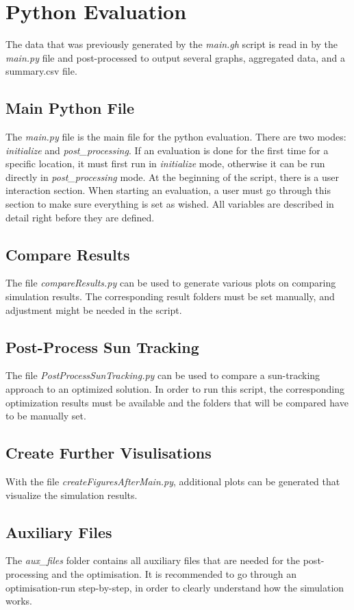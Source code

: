 \section{Python Evaluation}

	The data that was previously generated by the \emph{main.gh} script is read in by the \emph{main.py} file and post-processed to output several graphs, aggregated data, and a summary.csv file. 

	\subsection{Main Python File}
	The \emph{main.py} file is the main file for the python evaluation. There are two modes: \emph{initialize} and \emph{post\_processing}. If an evaluation is done for the first time for a specific location, it must first run in \emph{initialize} mode, otherwise it can be run directly in \emph{post\_processing} mode. 
	At the beginning of the script, there is a user interaction section. When starting an evaluation, a user must go through this section to make sure everything is set as wished. All variables are described in detail right before they are defined. 

	\subsection{Compare Results}
	The file \emph{compareResults.py} can be used to generate various plots on comparing simulation results. The corresponding result folders must be set manually, and adjustment might be needed in the script. 
	
	\subsection{Post-Process Sun Tracking}
	The file \emph{PostProcessSunTracking.py} can be used to compare a sun-tracking approach to an optimized solution. In order to run this script, the corresponding optimization results must be available and the folders that will be compared have to be manually set.

	\subsection{Create Further Visulisations}
	With the file \emph{createFiguresAfterMain.py}, additional plots can be generated that visualize the simulation results. 

	\subsection{Auxiliary Files}
	The \emph{aux\_files} folder contains all auxiliary files that are needed for the post-processing and the optimisation. It is recommended to go through an optimisation-run step-by-step, in order to clearly understand how the simulation works. 

